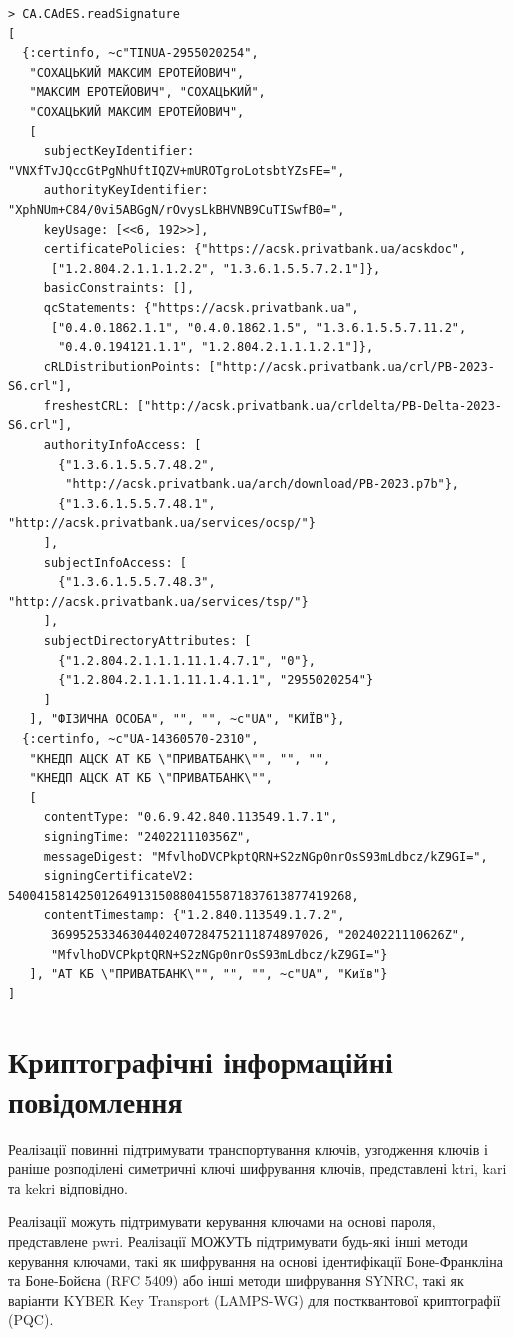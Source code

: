 \begin{verbatim}
> CA.CAdES.readSignature
[
  {:certinfo, ~c"TINUA-2955020254",
   "СОХАЦЬКИЙ МАКСИМ ЕРОТЕЙОВИЧ",
   "МАКСИМ ЕРОТЕЙОВИЧ", "СОХАЦЬКИЙ",
   "СОХАЦЬКИЙ МАКСИМ ЕРОТЕЙОВИЧ",
   [
     subjectKeyIdentifier: "VNXfTvJQccGtPgNhUftIQZV+mUROTgroLotsbtYZsFE=",
     authorityKeyIdentifier: "XphNUm+C84/0vi5ABGgN/rOvysLkBHVNB9CuTISwfB0=",
     keyUsage: [<<6, 192>>],
     certificatePolicies: {"https://acsk.privatbank.ua/acskdoc",
      ["1.2.804.2.1.1.1.2.2", "1.3.6.1.5.5.7.2.1"]},
     basicConstraints: [],
     qcStatements: {"https://acsk.privatbank.ua",
      ["0.4.0.1862.1.1", "0.4.0.1862.1.5", "1.3.6.1.5.5.7.11.2",
       "0.4.0.194121.1.1", "1.2.804.2.1.1.1.2.1"]},
     cRLDistributionPoints: ["http://acsk.privatbank.ua/crl/PB-2023-S6.crl"],
     freshestCRL: ["http://acsk.privatbank.ua/crldelta/PB-Delta-2023-S6.crl"],
     authorityInfoAccess: [
       {"1.3.6.1.5.5.7.48.2",
        "http://acsk.privatbank.ua/arch/download/PB-2023.p7b"},
       {"1.3.6.1.5.5.7.48.1", "http://acsk.privatbank.ua/services/ocsp/"}
     ],
     subjectInfoAccess: [
       {"1.3.6.1.5.5.7.48.3", "http://acsk.privatbank.ua/services/tsp/"}
     ],
     subjectDirectoryAttributes: [
       {"1.2.804.2.1.1.1.11.1.4.7.1", "0"},
       {"1.2.804.2.1.1.1.11.1.4.1.1", "2955020254"}
     ]
   ], "ФІЗИЧНА ОСОБА", "", "", ~c"UA", "КИЇВ"},
  {:certinfo, ~c"UA-14360570-2310",
   "КНЕДП АЦСК АТ КБ \"ПРИВАТБАНК\"", "", "",
   "КНЕДП АЦСК АТ КБ \"ПРИВАТБАНК\"",
   [
     contentType: "0.6.9.42.840.113549.1.7.1",
     signingTime: "240221110356Z",
     messageDigest: "MfvlhoDVCPkptQRN+S2zNGp0nrOsS93mLdbcz/kZ9GI=",
     signingCertificateV2: 540041581425012649131508804155871837613877419268,
     contentTimestamp: {"1.2.840.113549.1.7.2",
      36995253346304402407284752111874897026, "20240221110626Z",
      "MfvlhoDVCPkptQRN+S2zNGp0nrOsS93mLdbcz/kZ9GI="}
   ], "АТ КБ \"ПРИВАТБАНК\"", "", "", ~c"UA", "Київ"}
]
\end{verbatim}
\renewcommand{\footnotesize}{\normalsize}

\newpage
\section{Криптографічні інформаційні повідомлення}

Реалізації повинні підтримувати транспортування ключів, узгодження ключів
і раніше розподілені симетричні ключі шифрування ключів, представлені ktri,
kari та kekri відповідно.

Реалізації можуть підтримувати керування ключами на основі пароля,
представлене pwri. Реалізації МОЖУТЬ підтримувати будь-які інші методи
керування ключами, такі як шифрування на основі ідентифікації Боне-Франкліна
та Боне-Бойєна (RFC 5409) або інші методи шифрування SYNRC, такі як варіанти
KYBER Key Transport (LAMPS-WG) для постквантової криптографії (PQC).

